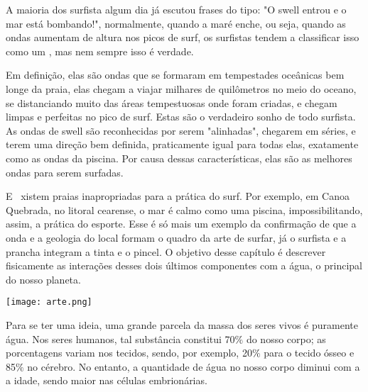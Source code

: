 \documentclass[book, 12pt, twoside, a5paper, english, brazil, sumario=tradicional, openany]{abntex2}
\begin{document}
A maioria dos surfista algum dia já escutou frases do tipo: "O swell entrou e o mar está bombando!", normalmente, quando a maré enche, ou seja, quando as ondas aumentam de altura nos picos de surf, os surfistas tendem a classificar isso como um {\color{celestialblue}{swell}}, mas nem sempre isso é verdade.

Em definição, elas são ondas que se formaram em tempestades oceânicas bem longe da praia, elas chegam a viajar milhares de quilômetros no meio do oceano, se distanciando muito das áreas tempestuosas onde foram criadas, e chegam limpas e perfeitas no pico de surf. Estas são o verdadeiro sonho de todo surfista. As ondas de swell são reconhecidas por serem "alinhadas", chegarem em séries, e terem uma direção bem definida, praticamente igual para todas elas, exatamente como as ondas da piscina. Por causa dessas características, elas são as melhores ondas para serem surfadas.

\newpage


\let\cleardoublepage\clearpage

\newpage
{}
{}

\vspace{-3cm}
\lettrine{E}{} \ xistem praias inapropriadas para a prática do surf. Por exemplo, em Canoa Quebrada, no litoral cearense, o mar é calmo como uma piscina, impossibilitando, assim, a prática do esporte. Esse é só mais um exemplo da confirmação de que a onda e a geologia do local formam o quadro da arte de surfar, já o surfista e a prancha integram a tinta e o pincel. O objetivo desse capítulo é descrever fisicamente as interações desses dois últimos componentes com a água, o principal {\color{celestialblue}{fluido}} do nosso planeta. 

\vspace{0.5cm}
\begin{center}
    \texttt{[image: arte.png]} 
\end{center}
\vspace{-0.13cm}

Para se ter uma ideia, uma grande parcela da massa dos seres vivos é puramente água. Nos seres humanos, tal substância
constitui 70$\%$ do nosso corpo; as porcentagens variam nos tecidos, sendo, por exemplo, 20$\%$ para
o tecido ósseo e 85$\%$ no cérebro. No entanto, a quantidade de água no nosso corpo diminui com a a idade, sendo maior nas células embrionárias.
\end{document}
